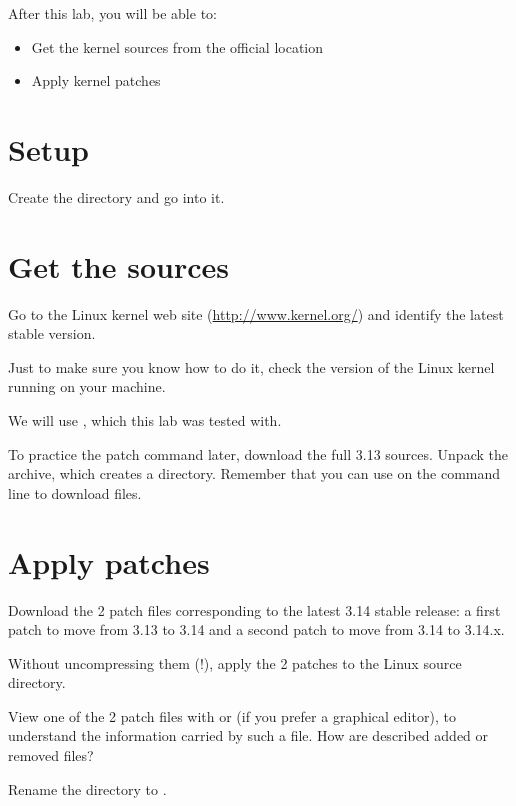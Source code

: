 
After this lab, you will be able to:
\begin{itemize}
\item Get the kernel sources from the official location
\item Apply kernel patches
\end{itemize}

\section{Setup}

Create the  directory and go into it.

\section{Get the sources}

Go to the Linux kernel web site (\url{http://www.kernel.org/}) and
identify the latest stable version.

Just to make sure you know how to do it, check the version of the
Linux kernel running on your machine.

We will use , which this lab was tested with.

To practice the patch command later, download the full 3.13
sources. Unpack the archive, which creates a 
directory. Remember that you can use  on the command
line to download files.

\section{Apply patches}

Download the 2 patch files corresponding to the latest 3.14 stable
release: a first patch to move from 3.13 to 3.14 and a second patch to
move from 3.14 to 3.14.x.

Without uncompressing them (!), apply the 2 patches to the Linux
source directory.

View one of the 2 patch files with  or 
(if you prefer a graphical editor), to understand the information carried
by such a file. How are described added or removed files?

Rename the  directory to .
